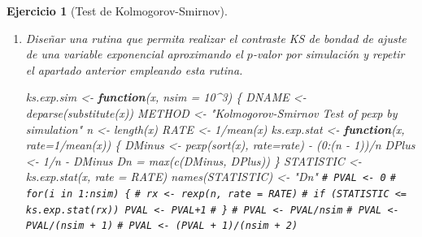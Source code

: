 \documentclass[
]{book}
\newenvironment{Shaded}{\begin{snugshade}}{\end{snugshade}}
\newcommand{\AttributeTok}[1]{\textcolor[rgb]{0.77,0.63,0.00}{#1}}
\newcommand{\CommentTok}[1]{\textcolor[rgb]{0.56,0.35,0.01}{\textit{#1}}}
\newcommand{\ControlFlowTok}[1]{\textcolor[rgb]{0.13,0.29,0.53}{\textbf{#1}}}
\newcommand{\DecValTok}[1]{\textcolor[rgb]{0.00,0.00,0.81}{#1}}
\newcommand{\FunctionTok}[1]{\textcolor[rgb]{0.00,0.00,0.00}{#1}}
\newcommand{\NormalTok}[1]{#1}
\newcommand{\OtherTok}[1]{\textcolor[rgb]{0.56,0.35,0.01}{#1}}
\newcommand{\SpecialCharTok}[1]{\textcolor[rgb]{0.00,0.00,0.00}{#1}}
\newcommand{\StringTok}[1]{\textcolor[rgb]{0.31,0.60,0.02}{#1}}
\theoremstyle{break}
\newtheorem{exercise}{Ejercicio}[chapter]
\theoremstyle{nonumberplain}
\renewcommand{\CommentTok}[1]{\textcolor[rgb]{0.41,0.41,0.41}{\texttt{#1}}}
\begin{document}
\begin{exercise}[Test de Kolmogorov-Smirnov]
\begin{enumerate}
  \begin{center}\texttt{[image: 07-Monte\_Carlo\_files/figure-latex/unnamed-chunk-55-1]} \texttt{[image: 07-Monte\_Carlo\_files/figure-latex/unnamed-chunk-55-2]} \end{center}
\item
  Diseñar una rutina que permita realizar el contraste KS de
  bondad de ajuste de una variable exponencial aproximando el
  \(p\)-valor por simulación y repetir el apartado anterior
  empleando esta rutina.

\begin{Shaded}
\begin{Highlighting}[]
\NormalTok{ks.exp.sim }\OtherTok{\textless{}{-}} \ControlFlowTok{function}\NormalTok{(x, }\AttributeTok{nsim =} \DecValTok{10}\SpecialCharTok{\^{}}\DecValTok{3}\NormalTok{) \{}
\NormalTok{  DNAME }\OtherTok{\textless{}{-}} \FunctionTok{deparse}\NormalTok{(}\FunctionTok{substitute}\NormalTok{(x))}
\NormalTok{  METHOD }\OtherTok{\textless{}{-}} \StringTok{"Kolmogorov{-}Smirnov Test of pexp by simulation"} 
\NormalTok{  n }\OtherTok{\textless{}{-}} \FunctionTok{length}\NormalTok{(x)}
\NormalTok{  RATE }\OtherTok{\textless{}{-}} \DecValTok{1}\SpecialCharTok{/}\FunctionTok{mean}\NormalTok{(x)}
\NormalTok{  ks.exp.stat }\OtherTok{\textless{}{-}} \ControlFlowTok{function}\NormalTok{(x, }\AttributeTok{rate=}\DecValTok{1}\SpecialCharTok{/}\FunctionTok{mean}\NormalTok{(x)) \{}
\NormalTok{    DMinus }\OtherTok{\textless{}{-}} \FunctionTok{pexp}\NormalTok{(}\FunctionTok{sort}\NormalTok{(x), }\AttributeTok{rate=}\NormalTok{rate) }\SpecialCharTok{{-}}\NormalTok{ (}\DecValTok{0}\SpecialCharTok{:}\NormalTok{(n }\SpecialCharTok{{-}} \DecValTok{1}\NormalTok{))}\SpecialCharTok{/}\NormalTok{n}
\NormalTok{    DPlus }\OtherTok{\textless{}{-}} \DecValTok{1}\SpecialCharTok{/}\NormalTok{n }\SpecialCharTok{{-}}\NormalTok{ DMinus}
\NormalTok{    Dn }\OtherTok{=} \FunctionTok{max}\NormalTok{(}\FunctionTok{c}\NormalTok{(DMinus, DPlus))}
\NormalTok{  \}  }
\NormalTok{  STATISTIC }\OtherTok{\textless{}{-}} \FunctionTok{ks.exp.stat}\NormalTok{(x, }\AttributeTok{rate =}\NormalTok{ RATE) }
  \FunctionTok{names}\NormalTok{(STATISTIC) }\OtherTok{\textless{}{-}} \StringTok{"Dn"}
  \CommentTok{\# PVAL \textless{}{-} 0}
  \CommentTok{\# for(i in 1:nsim) \{}
  \CommentTok{\#   rx \textless{}{-} rexp(n, rate = RATE)}
  \CommentTok{\#   if (STATISTIC \textless{}= ks.exp.stat(rx)) PVAL \textless{}{-} PVAL+1}
  \CommentTok{\# \}}
  \CommentTok{\# PVAL \textless{}{-} PVAL/nsim}
  \CommentTok{\# PVAL \textless{}{-} PVAL/(nsim + 1)}
  \CommentTok{\# PVAL \textless{}{-} (PVAL + 1)/(nsim + 2)}

\end{Highlighting}
\end{Shaded}
\end{enumerate}
\end{exercise}
\end{document}
